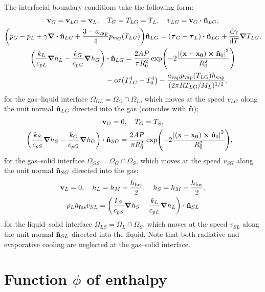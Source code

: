 \documentclass{article}
\newcommand{\fusion}[1]{{#1}_\mathrm{fus}}
\newcommand{\evapor}[1]{{#1}_\mathrm{vap}}
\newcommand{\bv}{\vb{v}}
\newcommand{\bn}{\vu{n}}
\newcommand{\btau}{\vb*\tau}
\begin{document}
The interfacial boundary conditions take the following form:
\begin{gather}
    \bv_G = \bv_{LG} = \bv_L, \quad T_G = T_{LG} = T_L, \quad v_{LG} = \bv_G\vdot\bn_{LG}, \\
    \qty(p_G - p_L + \gamma\div\bn_{LG} + \frac{3-\evapor{a}}4\evapor{p}(T_{LG}))\bn_{LG}
    = (\btau_G - \btau_L)\vdot\bn_{LG} + \dv{\gamma}{T}\grad{T_{LG}}, \\
    \begin{aligned}
    \qty( \frac{k_L}{c_{pL}}\grad{h}_L - \frac{k_G}{c_{pG}}\grad{h}_G )&\vdot\bn_{LG}
        = \frac{2AP}{\pi R_0^2}\exp(-2\frac{\abs{(\vb{x}-\vb{x_0})\cp\bn_0}^2}{R_0^2}) \\
        &- \epsilon\sigma\qty(T_{LG}^4-T_0^4)
        - \frac{\evapor{a}\evapor{p}(T_{LG})\evapor{h}}{(2\pi RT_{LG}/M_L)^{1/2}},
    \end{aligned}
\end{gather}
for the gas--liquid interface $\Omega_{GL} = \Omega_G\cap\Omega_L$,
which moves at the speed $v_{LG}$ along the unit normal $\bn_{LG}$ directed into the gas (coincides with $\bn$);
\begin{gather}
    \bv_G = 0, \quad T_G = T_S, \\
    \begin{aligned}
    \qty( \frac{k_S}{c_{pS}}\grad{h}_S - \frac{k_G}{c_{pG}}\grad{h}_G )&\vdot\bn_{SG}
        = \frac{2AP}{\pi R_0^2}\exp(-2\frac{\abs{(\vb{x}-\vb{x_0})\cp\bn_0}^2}{R_0^2}),
    \end{aligned}
\end{gather}
for the gas--solid interface $\Omega_{GS} = \Omega_G\cap\Omega_S$,
which moves at the speed $v_{SG}$ along the unit normal $\bn_{SG}$ directed into the gas;
\begin{gather}
    \bv_L = 0, \quad h_L = h_M + \frac{\fusion{h}}2, \quad
        h_S = h_M - \frac{\fusion{h}}2, \\
    \rho_L\fusion{h}v_{SL} = \qty(
        \frac{k_S}{c_{pS}}\grad{h}_S - \frac{k_L}{c_{pL}}\grad{h}_L )\vdot\bn_{SL}
\end{gather}
for the liquid--solid interface $\Omega_{LS} = \Omega_L\cap\Omega_S$,
which moves at the speed $v_{SL}$ along the unit normal $\bn_{SL}$ directed into the liquid. 
Note that both radiative and evaporative cooling are neglected at the gas--solid interface.

\section{Function $\phi$ of enthalpy}
\end{document}
